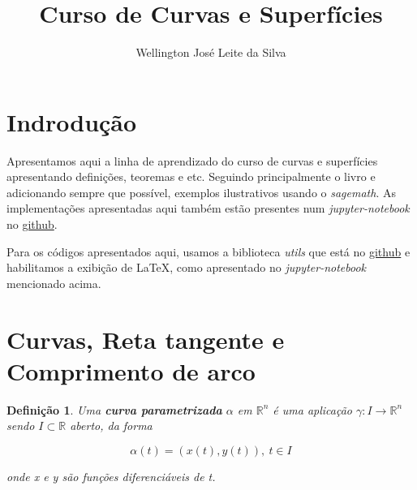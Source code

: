 \documentclass[12pt]{article}
\title{Curso de Curvas e Superfícies}
\author{Wellington José Leite da Silva\inst{1}}
\date{}
\newtheorem{definition}{Definição}
\begin{document}
\maketitle


\section*{Indrodução}\label{s1}
Apresentamos aqui a linha de aprendizado do curso de curvas e superfícies apresentando definições, teoremas e etc. Seguindo principalmente o livro \cite{bookmain} e adicionando sempre que possível, exemplos ilustrativos usando o \textit{sagemath}. As implementações apresentadas aqui também estão presentes num \textit{jupyter-notebook} no \href{https://github.com/wellington36/curvas-superficies/blob/main/Jupyter_auxiliary.ipynb}{github}.

Para os códigos apresentados aqui, usamos a biblioteca \textit{utils} que está no \href{https://github.com/wellington36/curvas-superficies/blob/main/utils.py}{github} e habilitamos a exibição de LaTeX, como apresentado no \textit{jupyter-notebook} mencionado acima.

\section{Curvas, Reta tangente e Comprimento de arco}\label{s2}

\begin{definition}
Uma \textbf{curva parametrizada} $\alpha$ em $\mathbb{R}^n$ é uma aplicação $\gamma: I \rightarrow \mathbb{R}^n$ sendo $I \subset \mathbb{R}$ aberto, da forma

$$\alpha(t) = (x(t), y(t)),\ t\in I$$

onde x e y são funções diferenciáveis de t.
\end{definition}
\end{document}
